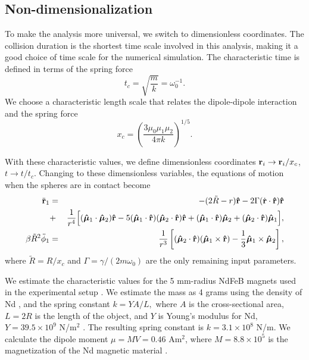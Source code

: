 \documentclass{article}
\begin{document}
\subsection{Non-dimensionalization}
To make the analysis more universal, we switch to dimensionless coordinates. 
The collision duration is the shortest time scale involved in this analysis, making it a good choice of time scale for the numerical simulation.
The characteristic time is defined in terms of the spring force
\begin{equation}
    t_c=\sqrt{\frac{m}{k}}=\omega_0^{-1}.
\end{equation}
We choose a  characteristic length scale that relates the dipole-dipole interaction and the spring force
\begin{equation}
    x_c=\left( \frac{ 3\mu_0 \mu_1 \mu_2}{4\pi  k} \right)^{1/5}.
\end{equation}

With these characteristic values, we define dimensionless coordinates
$\vb{r}_i \rightarrow {\vb{r}_i}/{x_c}$,
    $t \rightarrow {t}/{t_c}$.
Changing to these dimensionless variables, the equations of motion when the spheres are in contact become
\begin{eqnarray}
     \Ddot{\vb{r}}_1 &=&-(2\tilde{R}-r )\vu{r} -2\Gamma(\Dot{\vb{r}} \cdot\vu{r} )\vu{r} \nonumber \\
     &+& \frac{1}{r^4} \Big[ (   \bm{\hat{\mu}}_1 \cdot     \bm{\hat{\mu}}_2)\vu{r}
     -5(    \bm{\hat{\mu}}_1 \cdot \vu{r})(    \bm{\hat{\mu}}_2 \cdot \vu{r}) \vu{r}
     + (    \bm{\hat{\mu}}_1 \cdot \vu{r})    \bm{\hat{\mu}}_2 + (    \bm{\hat{\mu}}_2 \cdot \vu{r})    \bm{\hat{\mu}}_1   \Big] , \label{eq:EOMnon-dimensional}\\
     \beta \tilde{R}^2\Ddot{\phi}_1 &=& \frac{1}{ r^3}\left[(\bm{\hat{\mu}}_2\cdot\vu{r})(    \bm{\hat{\mu}}_1 \times \vu{r}) -    \frac{1}{3}\bm{\hat{\mu}}_1 \times  \bm{\hat{\mu}}_2 \right], \label{eq:torqueNon-dimensional}
\end{eqnarray}
where $\tilde{R}=R/x_c$ and $\Gamma=\gamma/(2m\omega_0)$ are the only remaining input parameters.

We estimate the characteristic values for the 5 mm-radius NdFeB magnets used in the experimental setup \cite{Lindn2018}.
We estimate the mass as 4 grams using the density of Nd \cite{magdata}, and the spring constant  
$    k= Y {A}/{L},$ where $A$ is the cross-sectional area,  $L=2R$ is the length of the object, and $Y$ is Young's modulus for Nd, $Y=39.5\times 10^9$ N/m$^2$ \cite{magdata2}. The resulting spring constant is $k=3.1 \times 10^8$ N/m.
We calculate the dipole moment $\mu=MV = 0.46$ Am$^2$, where $M=8.8\times 10^5$ is the magnetization of the Nd magnetic material \cite{Gonazlez2016}.
\end{document}
